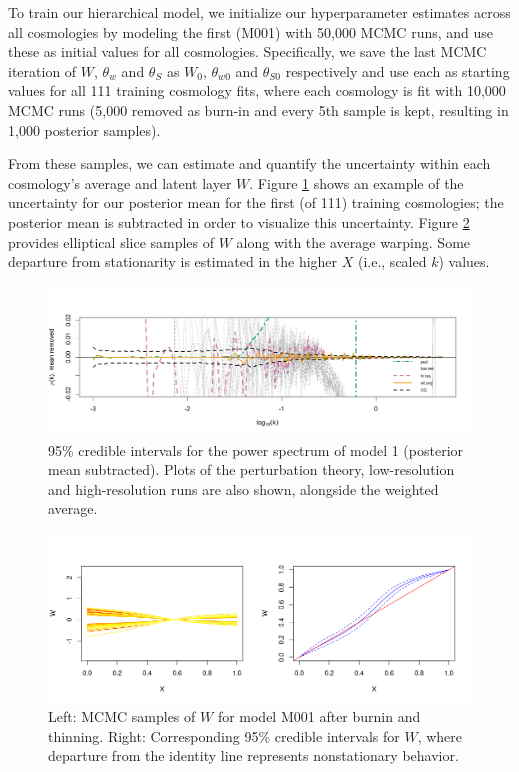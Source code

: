 \documentclass[11pt]{article}
\begin{document}
To train our hierarchical model, we initialize our hyperparameter estimates across 
all cosmologies by modeling the first (M001) with 50,000 MCMC runs, and use these 
as initial values for all cosmologies. Specifically, we save the last MCMC 
iteration of $W$, $\theta_w$ and $\theta_S$ as $W_0$, $\theta_{w0}$ and $\theta_{S0}$ 
respectively and use each as starting values for all 111 training cosmology fits, 
where each cosmology is fit with 10,000 MCMC runs (5,000 removed as burn-in and 
every 5th sample is kept, resulting in 1,000 posterior samples).

From these samples, we can estimate and quantify the uncertainty within each 
cosmology's average and latent layer $W$. Figure \ref{fig:plot_fit} shows an 
example of the uncertainty for our posterior mean for the first (of 111) training 
cosmologies; the posterior mean is subtracted in order to visualize this uncertainty. 
Figure \ref{fig:plot_warp} provides elliptical slice samples of $W$ along with the 
average warping. Some departure from stationarity is estimated in the higher $X$ 
(i.e., scaled $k$) values.

\begin{figure}[ht]
    \centering
    \includegraphics[width=6in]{plot_fit.png}
    \caption{95\% credible intervals for the power spectrum of model 1 (posterior mean 
             subtracted). Plots of the perturbation theory, low-resolution and high-resolution 
             runs are also shown, alongside the weighted average.}
    \label{fig:plot_fit}
\end{figure}

\begin{figure}[ht]
   \centering
   \includegraphics[width=6in]{plot_warp_M001.png}
   \caption{Left: MCMC samples of $W$ for model M001 after burnin and thinning. 
            Right: Corresponding 95\% credible intervals for $W$, where departure 
            from the identity line represents nonstationary behavior.}
   \label{fig:plot_warp}
\end{figure}
\end{document}
